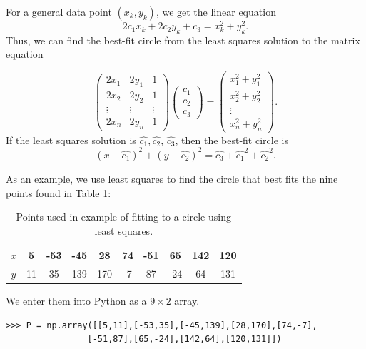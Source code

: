 For a general data point $(x_k, y_k)$, we get the linear equation
\begin{equation*}
2c_1x_k+2c_2y_k+c_3=x_k^2+y_k^2.
\end{equation*}
Thus, we can find the best-fit circle from the least squares solution to the matrix equation

\begin{equation}\label{equ:circle_fit}
\begin{pmatrix}
2 x_1 & 2 y_1 & 1\\
2 x_2 & 2 y_2 & 1\\
\vdots & \vdots & \vdots \\
2 x_n & 2 y_n & 1
\end{pmatrix}
\begin{pmatrix}
c_1\\
c_2\\
c_3
\end{pmatrix}=
\begin{pmatrix}
x_1^2 + y_1^2\\
x_2^2 + y_2^2\\
\vdots\\
x_n^2 + y_n^2
\end{pmatrix}.
\end{equation}
If the least squares solution is $\widehat{c_1}, \widehat{c_2}$, $\widehat{c_3}$, then the best-fit circle is
\[
(x-\widehat{c_1})^2 + (y-\widehat{c_2})^2 = \widehat{c_3}+\widehat{c_1}^2+\widehat{c_2}^2.
\]

As an example, we use least squares to find the circle that best fits the nine points found in Table \ref{table:circlepts}:

\begin{table}[H]
\begin{tabular}{c||c|c|c|c|c|c|c|c|c}
$x$& 5  &-53 & -45 &  28 & 74 & -51 &  65 & 142 & 120 \\ \hline
$y$& 11 & 35 & 139 & 170 & -7 &  87 & -24 &  64 & 131 \\
\end{tabular}
\caption{Points used in example of fitting to a circle using least squares.}
\label{table:circlepts}
\end{table}

We enter them into Python as a $9\times 2$ array.

\begin{lstlisting}
>>> P = np.array([[5,11],[-53,35],[-45,139],[28,170],[74,-7],
                [-51,87],[65,-24],[142,64],[120,131]])
\end{lstlisting}

